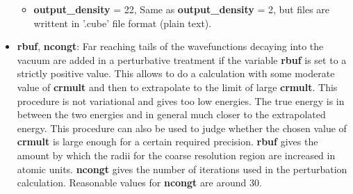 \documentclass[a4paper,11pt]{report}
\begin{document}
\begin{itemize}
\begin{itemize}
       \item {\bf output\_density} = 22, Same as {\bf output\_density} = 2, but files are writtent in '.cube' file format (plain text).
      \end{itemize}
\item {\bf rbuf}, {\bf ncongt}:  Far reaching tails of the wavefunctions decaying into the vacuum are  
      added in a perturbative treatment if the variable {\bf rbuf} is set to a strictly positive value. 
      This allows to do a calculation with some moderate 
      value of {\bf crmult} and then to extrapolate to the limit of large  {\bf crmult}. 
      This procedure is not variational and gives too low energies. The true energy is 
      in between the two energies and in general much closer to the extrapolated energy. 
      This procedure can also be used to judge whether the chosen value of  {\bf crmult} is 
      large enough for a certain required precision.
      {\bf rbuf} gives the amount by which the radii for the coarse resolution region 
      are increased in atomic units. {\bf ncongt} gives the number of iterations used 
      in the perturbation calculation. Reasonable values for {\bf ncongt} are around 30.  


\end{itemize}
\end{document}
